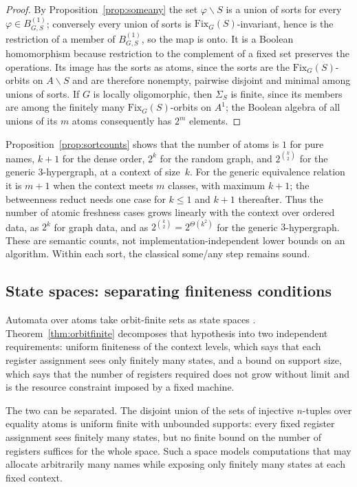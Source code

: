 \documentclass{lmcs}
\newcommand{\Fix}{\mathrm{Fix}}
\begin{document}
\begin{proof}
By Proposition~\ref{prop:someany} the set $\varphi\smallsetminus S$ is a
union of sorts for every $\varphi\in B^{(1)}_{G,S}$; conversely every
union of sorts is $\Fix_G(S)$-invariant, hence is the restriction of a
member of $B^{(1)}_{G,S}$, so the map is onto. It is a Boolean
homomorphism because restriction to the complement of a fixed set
preserves the operations. Its image has the sorts as atoms, since the
sorts are the $\Fix_G(S)$-orbits on $A\smallsetminus S$ and are
therefore nonempty, pairwise disjoint and minimal among unions of
sorts. If $G$ is locally oligomorphic, then $\Sigma_S$ is finite,
since its members are among the finitely many $\Fix_G(S)$-orbits on
$A^1$; the Boolean algebra of all unions of its $m$ atoms consequently
has $2^m$ elements.
\end{proof}

Proposition~\ref{prop:sortcounts} shows that the number of atoms is $1$ for pure names, $k+1$ for the dense order, $2^{k}$ for the random graph, and
$2^{\binom k2}$ for the generic $3$-hypergraph, at a context of size~$k$. For the generic equivalence relation it is $m+1$ when the
context meets $m$ classes, with maximum $k+1$; the betweenness reduct needs
one case for $k\leq1$ and $k+1$ thereafter. Thus the number of atomic
freshness cases grows linearly with the context over ordered data, as
$2^k$ for graph data, and as
$2^{\binom{k}{2}}=2^{\Theta(k^2)}$ for the generic $3$-hypergraph.
These are semantic counts, not implementation-independent lower bounds on
an algorithm. Within each sort, the classical some/any step remains
sound.

\subsection{State spaces: separating finiteness conditions}
\label{subsec:statespaces}

Automata over atoms take orbit-finite sets as state spaces
\cite{BKL14}. Theorem~\ref{thm:orbitfinite} decomposes that hypothesis
into two independent requirements: uniform finiteness of the context
levels, which says that each register assignment sees only finitely
many states, and a bound on support
size, which says that the number of registers required does not grow
without limit and is the resource constraint imposed by a fixed machine.

The two can be separated. The disjoint union of the sets of injective
$n$-tuples over equality atoms is uniform finite with unbounded
supports: every fixed register assignment sees finitely many states,
but no finite bound on the number of registers suffices for the whole
space. Such a space models computations that may allocate arbitrarily
many names while exposing only finitely many states at each fixed
context.
\end{document}
